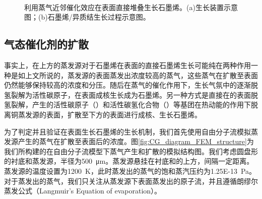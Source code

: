     \begin{figure}[htb]
        \\[-0.5ex]
        \caption{利用蒸气近邻催化效应在表面直接堆叠生长石墨烯。(a)生长装置示意图；(b)石墨烯/异质结生长过程示意图。}
        \label{fig:CG_diagram_CVD}
    \end{figure}

    \subsection{气态催化剂的扩散}
    \label{CG:FEM_CuVapor}
    事实上，在上方的蒸发源对于石墨烯在表面的直接石墨烯生长可能纯在两种作用\chinesecolon 一种是如上文所说的，蒸发源的表面蒸发出浓度较高的蒸气，这些蒸气在扩散至表面仍然能够保持较高的浓度和分压。随后在蒸气的催化作用下，生长气氛中的逐渐脱氢裂解为活性碳原子，在表面成核生长成为石墨烯。另一种方式是直接在的表面脱氢裂解，产生的活性碳原子（）和活性碳氢化合物（）等基团在热动能的作用下脱离铜蒸发源的表面，扩散至下方的表面进行成核、生长石墨烯。

    为了判定并且验证在表面生长石墨烯的生长机制，我们首先使用自由分子流模拟蒸发源产生的蒸气在扩散至表面后的浓度。图\ref{fig:CG_diagram_FEM_structure}为我们所构建的在自由分子流模型下蒸气产生和扩散的模拟结构图。我们考虑圆盘形的衬底和蒸发源，半径为\SI{500}{\micro\meter}。蒸发源悬挂在衬底和的上方，间隔一定距离。蒸发源的温度设置为\SI{1200}{\kelvin}，此时蒸发出的蒸气的饱和蒸汽压约为\SI{1.25E-13}{\pascal}。对于蒸发出的蒸气，我们只关注从蒸发源下表面蒸发出的原子流，并且遵循朗缪尔蒸发公式（Langmuir’s Equation of evaporation）。
    
